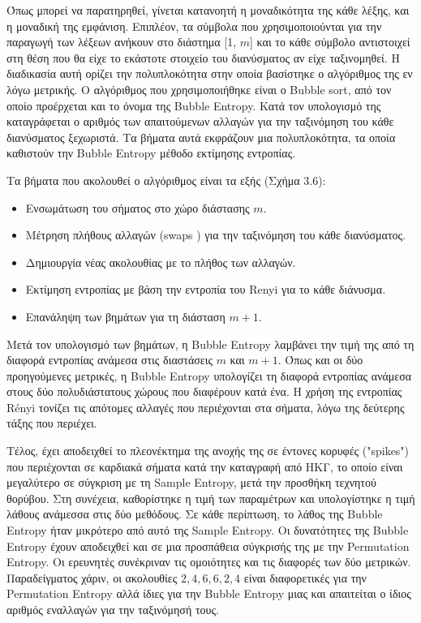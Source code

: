 Όπως μπορεί να παρατηρηθεί, γίνεται κατανοητή η μοναδικότητα της κάθε λέξης, και η μοναδική της εμφάνιση. Επιπλέον, τα σύμβολα που χρησιμοποιούνται για την παραγωγή των λέξεων ανήκουν στο διάστημα [1, $m$] και το κάθε σύμβολο αντιστοιχεί στη θέση που θα είχε το εκάστοτε στοιχείο του διανύσματος αν είχε ταξινομηθεί. H διαδικασία αυτή ορίζει την πολυπλοκότητα στην οποία βασίστηκε ο αλγόριθμος της εν λόγω μετρικής. Ο αλγόριθμος που χρησιμοποιήθηκε είναι ο \en Bubble sort, \gr από τον οποίο προέρχεται και το όνομα της \en Bubble Entropy. \gr Κατά τον υπολογισμό της καταγράφεται ο αριθμός των απαιτούμενων αλλαγών για την ταξινόμηση του κάθε διανύσματος ξεχωριστά. Τα βήματα αυτά εκφράζουν μια πολυπλοκότητα, τα οποία καθιστούν την \en Bubble Entropy \gr μέθοδο εκτίμησης εντροπίας. 
\par
Τα βήματα που ακολουθεί ο αλγόριθμος είναι τα εξής  (Σχήμα 3.6):
\begin{itemize}
	\item Ενσωμάτωση του σήματος στο χώρο διάστασης $m$.
	\item Μέτρηση πλήθους αλλαγών (\en swaps \gr) για την ταξινόμηση του κάθε διανύσματος.
	\item Δημιουργία νέας ακολουθίας με το πλήθος των αλλαγών. 
	\item Εκτίμηση εντροπίας με βάση την εντροπία του \en Renyi \gr για το κάθε διάνυσμα.
	\item Επανάληψη των βημάτων για τη διάσταση $m + 1$. 
\end{itemize}
Μετά τον υπολογισμό των βημάτων, η \en Bubble Entropy \gr λαμβάνει την τιμή της από τη διαφορά εντροπίας ανάμεσα στις διαστάσεις $m$ και $m + 1$.
Όπως και οι δύο προηγούμενες μετρικές, η \en Bubble Entropy \gr υπολογίζει τη διαφορά εντροπίας ανάμεσα στους δύο πολυδιάστατους χώρους που διαφέρουν κατά ένα. Η χρήση της εντροπίας \en Rényi \gr τονίζει τις απότομες αλλαγές που περιέχονται στα σήματα, λόγω της δεύτερης τάξης που περιέχει. 
\par
Τέλος, έχει αποδειχθεί το πλεονέκτημα της ανοχής της σε έντονες κορυφές (\en "spikes"\gr) που περιέχονται σε καρδιακά σήματα κατά την καταγραφή από ΗΚΓ, το οποίο είναι μεγαλύτερο σε σύγκριση με τη \en Sample Entropy, \gr μετά την προσθήκη τεχνητού θορύβου. Στη συνέχεια, καθορίστηκε η τιμή των παραμέτρων και υπολογίστηκε η τιμή λάθους ανάμεσσα στις δύο μεθόδους. Σε κάθε περίπτωση, το λάθος της \en Bubble Entropy \gr ήταν μικρότερο από αυτό της \en Sample Entropy. \gr Οι δυνατότητες της \en Bubble Entropy \gr έχουν αποδειχθεί και σε μια προσπάθεια σύγκρισής της με την \en Permutation Entropy. \gr Οι ερευνητές συνέκριναν τις ομοιότητες και τις διαφορές των δύο μετρικών. Παραδείγματος χάριν, οι ακολουθίες ${2, 4, 6}, {6, 2, 4}$ είναι διαφορετικές για την \en Permutation Entropy \gr αλλά ίδιες για την \en Bubble Entropy \gr μιας και απαιτείται ο ίδιος αριθμός εναλλαγών για την ταξινόμησή τους.

